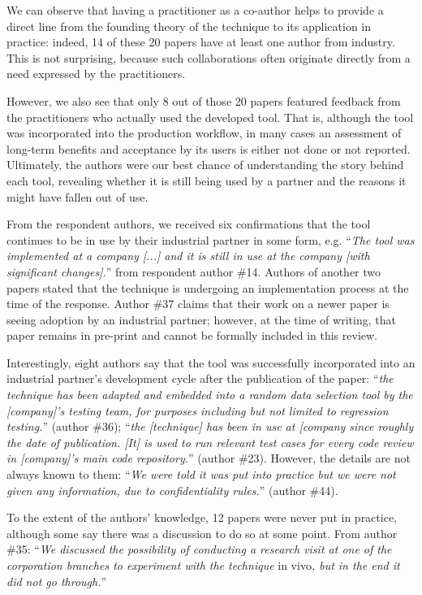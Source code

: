 We can observe that having a practitioner as a co-author helps to provide a direct line from the founding theory of the technique to its application in practice: 
indeed, 14 of these 20 papers have at least one author from industry.
This is not surprising, because such collaborations often originate directly from a need expressed by the practitioners.

However, we also see that only 8 out of those 20 papers featured feedback from the practitioners who actually used the developed tool.
That is, although the tool was incorporated into the production workflow, in many cases an assessment of long-term benefits and acceptance by its users is either not done or not reported.
%
Ultimately, the authors were our best chance of understanding the story behind each tool, revealing whether it is still being used by a partner and the reasons it might have fallen out of use.

From the respondent authors, we received six confirmations that the tool continues to be in use by their industrial partner in some form, e.g. ``\textit{The tool was implemented at a company [...] and it is still in use at the company [with significant changes].}'' from respondent author \#14.
Authors of another two papers stated that the technique is undergoing an implementation process at the time of the response.
Author \#37 claims that their work on a newer paper is seeing adoption by an industrial partner; however, at the time of writing, that paper remains in pre-print and cannot be formally included in this review.

Interestingly, eight authors say that the tool was successfully incorporated into an industrial partner's development cycle after the publication of the paper: ``\textit{the technique has been adapted and embedded into a random data selection tool by the [company]’s testing team, for purposes including but not limited to regression testing.}'' (author \#36); ``\textit{the [technique] has been in use at [company since roughly the date of publication. [It] is used to run relevant test cases for every code review in [company]'s main code repository.}'' (author \#23).
However, the details are not always known to them: ``\textit{We were told it was put into practice but we were not given any information, due to confidentiality rules.}'' (author \#44).

To the extent of the authors' knowledge, 12 papers were never put in practice, although some say there was a discussion to do so at some point.
From author \#35: ``\textit{We discussed the possibility of conducting a research visit at one of the corporation branches to experiment with the technique} in vivo\textit{, but in the end it did not go through.}''

